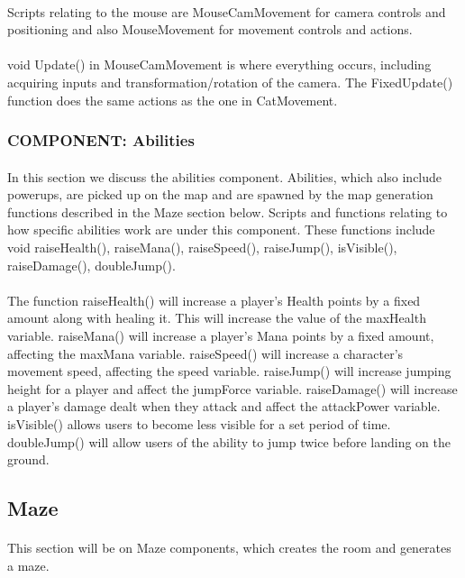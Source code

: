 \documentclass[12pt, titlepage]{article}
\begin{document}
\paragraph{}Scripts relating to the mouse are MouseCamMovement for camera controls and positioning and also MouseMovement for movement controls and actions.
\paragraph{} void Update() in MouseCamMovement is where everything occurs, including acquiring inputs and transformation/rotation of the camera. The FixedUpdate() function does the same actions as the one in CatMovement.
\subsubsection{COMPONENT: Abilities}
\paragraph{} In this section we discuss the abilities component. Abilities, which also include powerups, are picked up on the map and are spawned by the map generation functions described in the Maze section below. Scripts and functions relating to how specific abilities work are under this component. These functions include void raiseHealth(), raiseMana(), raiseSpeed(), raiseJump(), isVisible(), raiseDamage(), doubleJump().
\paragraph{} The function raiseHealth() will increase a player's Health points by a fixed amount along with healing it. This will increase the value of the maxHealth variable. raiseMana() will increase a player's Mana points by a fixed amount, affecting the maxMana variable. raiseSpeed() will increase a character's movement speed, affecting the speed variable. raiseJump() will increase jumping height for a player and affect the jumpForce variable. raiseDamage() will increase a player's damage dealt when they attack and affect the attackPower variable. isVisible() allows users to become less visible for a set period of time. doubleJump() will allow users of the ability to jump twice before landing on the ground.
\subsection{Maze}
\paragraph{} This section will be on Maze components, which creates the room and generates a maze.
\end{document}
